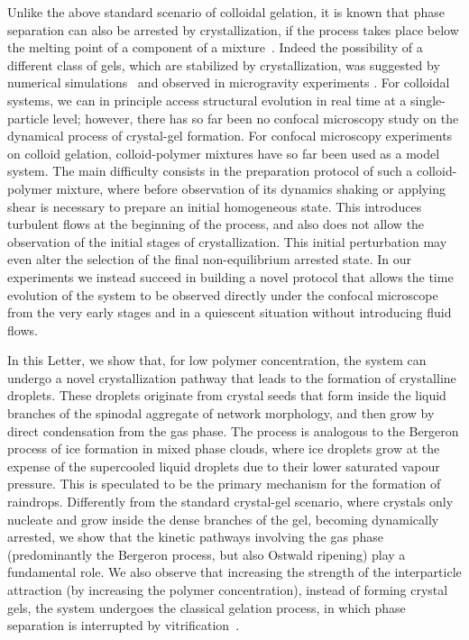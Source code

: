 \documentclass[preprint,amsmath,amssymb,superscriptaddress]{revtex4-1}
\begin{document}
Unlike the above standard scenario of colloidal gelation, it is known that phase separation can also be arrested by crystallization, if the process takes place below the melting point of a component of a mixture~\cite{tanaka1985new}. Indeed the possibility of a different class of gels, which are stabilized by crystallization, 
was suggested by numerical simulations~\cite{soga1999metastable,fortini2008crystallization,perez2011pathways} and observed in microgravity experiments \cite{sabin2012}. 
For colloidal systems, we can in principle access structural evolution in real time at a single-particle level; however, there has so far been no confocal microscopy  
study on the dynamical process of crystal-gel formation. 
For confocal microscopy experiments on colloid gelation, colloid-polymer mixtures have so far been used as a model system. 
The main difficulty consists in the preparation protocol of such a colloid-polymer mixture, where before observation of its dynamics shaking or applying shear is necessary to prepare an initial homogeneous state. This introduces turbulent flows at the beginning of the process, and also does not allow the
observation of the initial stages of crystallization. This initial perturbation may even alter the selection of the final non-equilibrium arrested state.  
In our experiments we instead succeed in building a novel protocol that allows the time evolution of the system to be observed directly
under the confocal microscope from the very early stages and in a quiescent situation without introducing fluid flows. 

In this Letter, we show that, for low polymer concentration, the system can undergo a novel crystallization pathway that leads to the formation
of crystalline droplets. These droplets originate from crystal seeds that form inside the liquid branches of the spinodal aggregate of network morphology, and then grow by direct condensation from the gas phase. The process is analogous to the Bergeron process of ice formation in mixed phase clouds, where ice droplets grow at the
expense of the supercooled liquid droplets due to their lower saturated vapour pressure. 
This is speculated to be the primary mechanism for the formation of raindrops. 
Differently from the standard crystal-gel scenario, where crystals only nucleate and grow inside the dense branches of the gel, becoming dynamically arrested, we show that the kinetic
pathways involving the gas phase (predominantly the Bergeron process, but also Ostwald ripening) play a fundamental role. We also observe that increasing the strength of the interparticle attraction
(by increasing the polymer concentration), instead of forming crystal gels, the system undergoes the classical gelation process, in which
phase separation is interrupted by vitrification~\cite{verhaegh1997transient,tanaka1999colloid,Royall2007,lu2008gelation}. 
\end{document}
